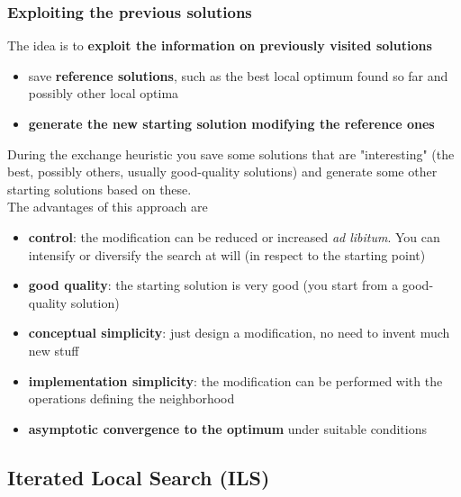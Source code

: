 \documentclass[11pt]{article}
\begin{document}
	\newpage
	
	\subsubsection{Exploiting the previous solutions}
	The idea is to \textbf{exploit the information on previously visited solutions}
	\begin{itemize}
		\item save \textbf{reference solutions}, such as the best local optimum found so far and possibly other local optima
		
		\item \textbf{generate the new starting solution modifying the reference ones}
	\end{itemize}
	
	During the exchange heuristic you save some solutions that are "interesting" (the best, possibly others, usually good-quality solutions) and generate some other starting solutions based on these.\\ 
	
	The advantages of this approach are
	\begin{itemize}
		\item \textbf{control}: the modification can be reduced or increased \textit{ad libitum}. You can intensify or diversify the search at will (in respect to the starting point)
		
		\item \textbf{good quality}: the starting solution is very good (you start from a good-quality solution)
		
		\item \textbf{conceptual simplicity}: just design a modification, no need to invent much new stuff
		
		\item \textbf{implementation simplicity}: the modification can be performed with the operations defining the neighborhood
		
		\item \textbf{asymptotic convergence to the optimum} under suitable conditions
	\end{itemize}
	
	\newpage
	
	\subsection{Iterated Local Search (ILS)}
	
\end{document}
